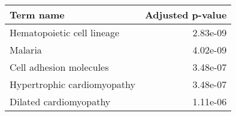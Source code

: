 \begin{tabular}{lr}
\toprule
                   Term name &  Adjusted p-value \\
\midrule
  Hematopoietic cell lineage &          2.83e-09 \\
                     Malaria &          4.02e-09 \\
     Cell adhesion molecules &          3.48e-07 \\
 Hypertrophic cardiomyopathy &          3.48e-07 \\
      Dilated cardiomyopathy &          1.11e-06 \\
\bottomrule
\end{tabular}
